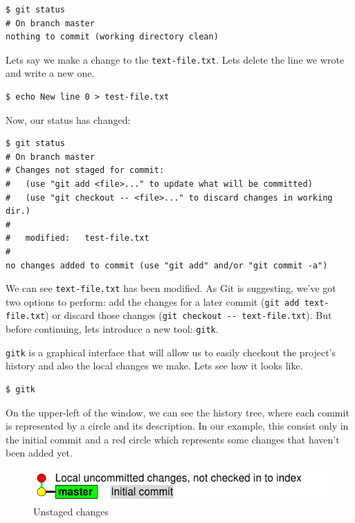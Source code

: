 \documentclass[a4paper,10pt]{article}
\newenvironment{terminal}
  {
    \vspace{+10pt}
    \begin{center}
    \begin{minipage}{0.95\textwidth}
    \begin{framed}
  }
  {
    \end{framed}
    \end{minipage}
    \end{center}
    \vspace{+10pt}
  }
\begin{document}
\begin{terminal}
\begin{verbatim}
$ git status
# On branch master
nothing to commit (working directory clean)
\end{verbatim}
\end{terminal}

Lets say we make a change to the \texttt{text-file.txt}. Lets delete the
line we wrote and write a new one.

\begin{terminal}
\begin{verbatim}
$ echo New line 0 > test-file.txt
\end{verbatim}
\end{terminal}

Now, our status has changed:

\begin{terminal}
\begin{verbatim}
$ git status
# On branch master
# Changes not staged for commit:
#   (use "git add <file>..." to update what will be committed)
#   (use "git checkout -- <file>..." to discard changes in working dir.)
#
#	modified:   test-file.txt
#
no changes added to commit (use "git add" and/or "git commit -a")
\end{verbatim}
\end{terminal}

We can see \texttt{text-file.txt} has been modified. As Git is
suggesting, we've got two options to perform: add the changes for a
later commit (\texttt{git add text-file.txt}) or discard those changes
(\texttt{git checkout -{}- text-file.txt}). But before continuing, lets
introduce a new tool: \texttt{gitk}.

\texttt{gitk} is a graphical interface that will allow us to easily
checkout the project's history and also the local changes we make. Lets
see how it looks like.

\begin{terminal}
\begin{verbatim}
$ gitk
\end{verbatim}
\end{terminal}

On the upper-left of the window, we can see the history tree, where
each commit is represented by a circle and its description. In our
example, this consist only in the initial commit and a red circle which
represents some changes that haven't been added yet.

\begin{figure}[h]
  \begin{center}
    \includegraphics[scale=0.5]{git_example-00}
  \end{center}
  \caption{Unstaged changes}
\end{figure}
\end{document}

